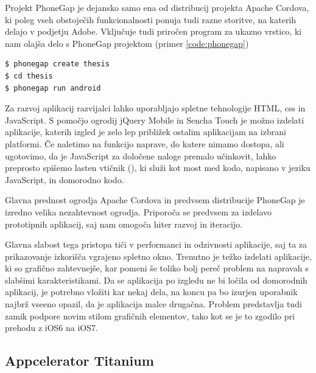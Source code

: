 Projekt PhoneGap\cite{phonegap} je dejansko samo ena od distribucij projekta Apache Cordova, ki poleg vseh obstoječih funkcionalnosti ponuja tudi razne storitve, na katerih delajo v podjetju Adobe. Vključuje tudi priročen program za ukazno vrstico, ki nam olajša delo s PhoneGap projektom (primer \ref{code:phonegap})

\begin{lstlisting}[caption=Primer uporabe programa phonegap za ukazno vrstico. Zadnja vrstica zažene pravkar ustvarjeno prazno aplikacijo na Android napravi ali emulatorju., label=code:phonegap]
$ phonegap create thesis
$ cd thesis
$ phonegap run android
\end{lstlisting}

Za razvoj aplikacij razvijalci lahko uporabljajo spletne tehnologije HTML, \gls{css} in JavaScript. S pomočjo ogrodij jQuery Mobile\cite{jquerymobile} in Sencha Touch\cite{sencha} je možno izdelati aplikacije, katerih izgled je zelo lep približek ostalim aplikacijam na izbrani platformi. Če naletimo na funkcijo naprave, do katere nimamo dostopa, ali ugotovimo, da je JavaScript za določene naloge premalo učinkovit, lahko preprosto spišemo lasten vtičnik (), ki služi kot most med kodo, napisano v jeziku JavaScript, in domorodno kodo.

Glavna prednost ogrodja Apache Cordova in predvsem distribucije PhoneGap je izredno velika nezahtevnost ogrodja. Priporoča se predvsem za izdelavo prototipnih aplikacij, saj nam omogoča hiter razvoj in iteracijo.

Glavna slabost tega pristopa tiči v performanci in odzivnosti aplikacije, saj ta za prikazovanje izkorišča vgrajeno spletno okno. Trenutno je težko izdelati aplikacije, ki so grafično zahtevnejše, kar pomeni še toliko bolj pereč problem na napravah s slabšimi karakteristikami. Da se aplikacija po izgledu ne bi ločila od domorodnih aplikacij, je potrebno vložiti kar nekaj dela, na koncu pa bo izurjen uporabnik najbrž vseeno opazil, da je aplikacija malce drugačna. Problem predstavlja tudi zamik podpore novim stilom grafičnih elementov, tako kot se je to zgodilo pri prehodu z iOS6 na iOS7.

\subsection{Appcelerator Titanium}


